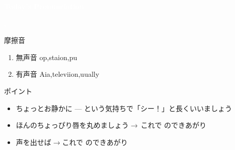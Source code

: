 \documentclass[aspectratio=169,xcolor={dvipsnames,table}]{beamer}
\begin{document}
\begin{frame}
\centering
  \textcolor{white}{\Huge\bfseries Today's Pronunciation}\pause

 \vspace{30pt}

  \textcolor{white}{\Huge\bfseries {}, }



\end{frame}
 \begin{frame}[plain]{摩擦音}

\large

\begin{enumerate}
 \item  無声音 \hspace{20pt}op,\hspace{1\zw}staion,\hspace{1\zw}pu
 \item  有声音 \hspace{20pt}Aia,\hspace{1\zw}televiion,\hspace{1\zw}uually
\end{enumerate}

\vspace*{20pt}

\normalsize
ポイント

\begin{itemize}
 \item ちょっとお静かに --- という気持ちで「シー！」と長くいいましょう
 \item ほんのちょっぴり唇を丸めましょう$\rightarrow$\,これで\,\,のできあがり 
 \item 声を出せば$\rightarrow$これで\,\,のできあがり
\end{itemize}
\hfill{}



\end{frame}
\end{document}
